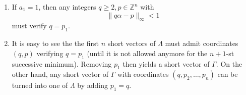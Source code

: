 \documentclass[12pt,a4paper]{article}
\theoremstyle{plain}
\theoremstyle{definition}
\def \Z {\mathbb Z}
\begin{document}
{}{
	\begin{enumerate}
		\item If $a_1 = 1$, then any integers $q \geq 2, p \in \Z^n$ with
			\[ \| q \alpha - p \|_\infty < 1 \]
		must verify $q = p_1$.

		\item It is easy to see the the first $n$ short vectors of $\Lambda$ must admit coordinates $(q, p)$ verifying $q = p_1$ (until it is not allowed anymore for the $n+1$-st successive minimum).
		Removing $p_1$ then yields a short vector of $\Gamma$. On the other hand, any short vector of $\Gamma$ with coordinates $(q, p_2, \dots, p_n)$ can be turned into one of $\Lambda$ by adding $p_1 = q$.


	\end{enumerate}


}
\end{document}
